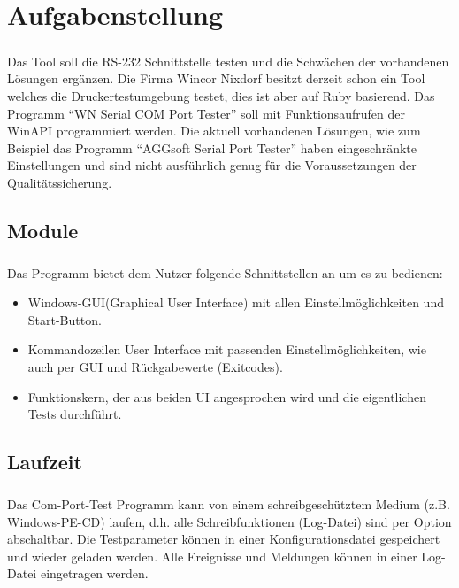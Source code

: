 
\chapter{Aufgabenstellung}\label{chp:aufgabenstellung}
\paragraph{}
Das Tool soll die RS-232 Schnittstelle testen und die Schwächen der vorhandenen Lösungen ergänzen. Die Firma Wincor Nixdorf besitzt derzeit schon ein Tool welches die Druckertestumgebung testet, dies ist aber auf Ruby basierend. Das Programm "`WN Serial COM Port Tester"' soll mit Funktionsaufrufen der WinAPI programmiert werden. Die aktuell vorhandenen Lösungen, wie zum Beispiel das Programm "`AGGsoft Serial Port Tester"' haben eingeschränkte Einstellungen und sind nicht ausführlich genug für die Voraussetzungen der Qualitätssicherung.

\section{Module}
\paragraph{}
Das Programm bietet dem Nutzer folgende Schnittstellen an um es zu bedienen:
\begin{itemize}
\item Windows-GUI(Graphical User Interface) mit allen Einstellmöglichkeiten und Start-Button.
\item Kommandozeilen User Interface mit passenden Einstellmöglichkeiten, wie auch per GUI und Rückgabewerte (Exitcodes).
\item Funktionskern, der aus beiden UI angesprochen wird und die eigentlichen Tests durchführt.
\end{itemize}


\section{Laufzeit}
\paragraph{}
Das Com-Port-Test Programm kann von einem schreibgeschütztem Medium (z.B. Windows-PE-CD) laufen, d.h. alle Schreibfunktionen (Log-Datei) sind per Option abschaltbar. Die Testparameter können in einer Konfigurationsdatei gespeichert und wieder geladen werden. Alle Ereignisse und Meldungen können in einer Log-Datei eingetragen werden. 

